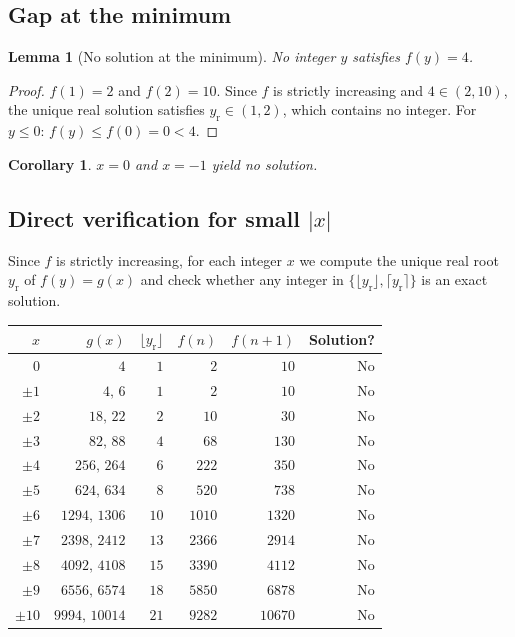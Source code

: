 \documentclass[12pt, a4paper]{article}
\newtheorem{lemma}[theorem]{Lemma}
\newtheorem{corollary}[theorem]{Corollary}
\theoremstyle{definition}
\begin{document}
\subsection{Gap at the minimum}

\begin{lemma}[No solution at the minimum]\label{lem:gap}
  No integer $y$ satisfies $f(y) = 4$.
\end{lemma}

\begin{proof}
  $f(1) = 2$ and $f(2) = 10$.  Since $f$ is strictly increasing and
  $4 \in (2, 10)$, the unique real solution satisfies $y_{\mathrm{r}} \in (1,2)$,
  which contains no integer.   For $y \leq 0$: $f(y) \leq f(0) = 0 < 4$.
\end{proof}

\begin{corollary}
  $x = 0$ and $x = -1$ yield no solution.
\end{corollary}

\subsection{Direct verification for small $|x|$}

Since $f$ is strictly increasing, for each integer $x$ we compute the unique
real root $y_{\mathrm{r}}$ of $f(y) = g(x)$ and check whether any integer in
$\{\lfloor y_{\mathrm{r}} \rfloor, \lceil y_{\mathrm{r}} \rceil\}$ is an exact solution.

\begin{center}
\renewcommand{\arraystretch}{1.2}
\begin{tabular}{rrrrrr}
\toprule
$x$ & $g(x)$ & $\lfloor y_{\mathrm{r}} \rfloor$ & $f(n)$ & $f(n{+}1)$ & Solution? \\
\midrule
$0$   & $4$      & $1$  & $2$         & $10$        & No \\
$\pm 1$ & $4,\,6$  & $1$  & $2$         & $10$        & No \\
$\pm 2$ & $18,\,22$  & $2$  & $10$        & $30$        & No \\
$\pm 3$ & $82,\,88$  & $4$  & $68$        & $130$       & No \\
$\pm 4$ & $256,\,264$ & $6$ & $222$       & $350$       & No \\
$\pm 5$ & $624,\,634$ & $8$ & $520$       & $738$       & No \\
$\pm 6$ & $1294,\,1306$ & $10$ & $1010$   & $1320$      & No \\
$\pm 7$ & $2398,\,2412$ & $13$ & $2366$   & $2914$      & No \\
$\pm 8$ & $4092,\,4108$ & $15$ & $3390$   & $4112$      & No \\
$\pm 9$ & $6556,\,6574$ & $18$ & $5850$   & $6878$      & No \\
$\pm 10$ & $9994,\,10014$ & $21$ & $9282$ & $10670$     & No \\
\bottomrule
\end{tabular}
\end{center}
\end{document}
